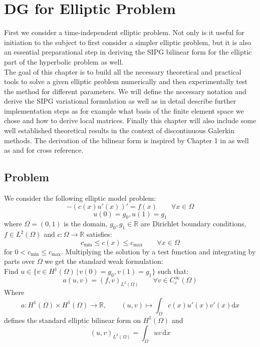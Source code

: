 \chapter{DG for Elliptic Problem}

First we consider a time-independent elliptic problem. Not only is it
useful for initiation to the subject to first consider a simpler elliptic problem, but it
is also an essential preparational step in deriving the SIPG bilinear form for the
elliptic part of the hyperbolic problem as well.
\\
The goal of this chapter is to build all the necessary theoretical and practical
tools to solve a given elliptic problem
numerically and then experimentally test the method for different parameters.
We will define the necessary notation and derive
the SIPG variational formulation as well as in detail describe further implementation steps as
for example what basis of the finite element space we chose and how to derive local matrices.
Finally this chapter will also include some well established theoretical results in
the context of discontinuous Galerkin methods.
The derivation
of the bilinear form is inspired by
Chapter 1 in \cite{riviere2008} as well as \cite{georgoulis2011Springer} and \cite{grote2006}
for cross reference.

\section{Problem}
\label{sec:elliptic_problem}
We consider the following elliptic model problem:
\begin{equation}
	\label{eq:elliptic_pde}
	-(c(x)u'(x))' = f(x) \qquad \forall x\in \Omega
\end{equation}
\begin{equation}
	\label{eq:elliptic_pde_bc}
	u(0) = g_0, u(1) = g_1
\end{equation}
where $\Omega = (0,1)$ is the domain, $g_0, g_1 \in \mathbb{R}$ are
Dirichlet boundary conditions, $f \in L^2(\Omega)$ and $c:\Omega \to \mathbb{R}$
satisfies:
\[
	c_{\min} \leq c(x) \leq c_{\max} \qquad \forall x\in \Omega
\]
for $0 < c_{\min} \leq c_{\max}$.
Multiplying the solution by a test function and integrating by parts over $\Omega$ we get the
standard weak formulation: \\
Find $u \in \{v \in H^1(\Omega)\, | \,  v(0) = g_0, v(1) = g_1\} $ such that:
\begin{equation}
	\label{eq:elliptic_weak_form}
	a(u,v) = (f,v)_{L^2(\Omega)} \qquad \forall v \in C_c^{\infty}(\Omega)
\end{equation}
Where
\[
	a:H^1(\Omega) \times H^1(\Omega) \to \mathbb{R}, \qquad (u,v) \mapsto \int_{\Omega} c(x)u'(x)v'(x) \text{d}x
\]
defines the standard elliptic bilinear form on $H^1(\Omega)$ and
\[
	(u,v)_{L^2(\Omega)} = \int_{\Omega} uv \,\text{d}x
\]

